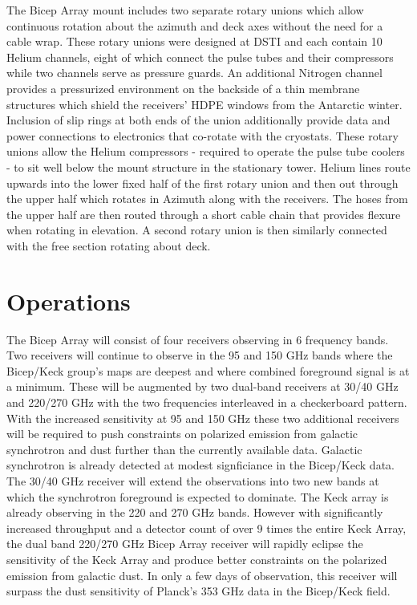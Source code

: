 \documentclass[]{spie}  %
\begin{document}
The Bicep Array mount includes two separate rotary unions which allow
continuous rotation about the azimuth and deck axes without the need for a
cable wrap. These rotary unions were designed at DSTI and each contain 10
Helium channels, eight of which connect the pulse tubes and their compressors
while two channels serve as pressure guards. An additional Nitrogen channel
provides a pressurized environment on the backside of a thin membrane
structures which shield the receivers' HDPE windows from the Antarctic winter.
Inclusion of slip rings at both ends of the union additionally provide data and power
connections to electronics that co-rotate with the cryostats. These rotary
unions allow the Helium compressors - required to operate the
pulse tube coolers - to sit well below the mount structure in the
stationary tower. Helium lines route upwards into the lower fixed half of the first
rotary union and then out through the upper half which rotates in Azimuth
along with the receivers. The hoses from the upper half are then routed through a
short cable chain that provides flexure when rotating in elevation. A
second rotary union is then similarly connected with the free section rotating
about deck. 


\section{Operations}

The Bicep Array will consist of four receivers observing in 6 frequency bands.
Two receivers will continue to observe in the 95 and 150 GHz bands where the
Bicep/Keck group's maps are deepest and where combined foreground
signal is at a minimum. These will be augmented by two dual-band receivers at
30/40 GHz and 220/270 GHz with the two frequencies interleaved in a
checkerboard pattern. With the increased sensitivity at 95 and 150 GHz these
two additional receivers will be required to push constraints on polarized
emission from galactic synchrotron and dust further than the currently available data.
Galactic synchrotron is already detected at modest signficiance in the
Bicep/Keck data. The 30/40 GHz receiver will extend the observations into two
new bands at which the synchrotron foreground is expected to dominate. The
Keck array is already observing in the 220 and 270 GHz bands.  However with
significantly increased throughput and a detector count of over 9 times the
entire Keck Array, the dual band 220/270 GHz Bicep Array receiver will rapidly
eclipse the sensitivity of the Keck Array and produce better constraints on
the polarized emission from galactic dust. In only a few days of observation,
this receiver will surpass the dust sensitivity of Planck's 353 GHz data in
the Bicep/Keck field. 
\end{document}
